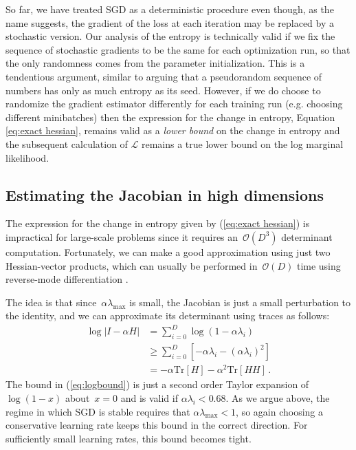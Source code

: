 \documentclass[]{article}
\newcommand{\varL}{\mathcal{L}}
\newcommand{\stepsize}{\alpha}
\newcommand{\bigo}[1]{\mathcal{O}\left(#1\right)}
\newcommand{\trace}[1]{\text{Tr}\left[#1\right]}
\begin{document}
So far, we have treated SGD as a deterministic procedure even though, as the name suggests,
the gradient of the loss at each iteration may be replaced by a stochastic
version. Our analysis of the entropy is technically valid if we fix the sequence of stochastic gradients to be the same for each optimization run, so that the only randomness comes from the parameter initialization.
This is a tendentious argument, similar to arguing that a pseudorandom sequence of numbers has only as much entropy as its seed.
However, if we do choose to randomize the gradient estimator differently for each training run
(e.g. choosing different minibatches) then the expression for the change in entropy, Equation \ref{eq:exact hessian}, remains valid as a \emph{lower bound} on the change in entropy and the 
subsequent calculation of $\varL$ remains a true lower bound on the log marginal likelihood.


\subsection{Estimating the Jacobian in high dimensions}
\label{sec:scalable-estimator}
The expression for the change in entropy given by (\ref{eq:exact hessian}) is impractical for large-scale problems since it requires an~$\bigo{D^3}$ determinant computation.
Fortunately, we can make a good approximation using just two Hessian-vector products, which can usually be performed in~$\bigo{D}$ time using reverse-mode differentiation \citep{pearlmutter1994fast}.

The idea is that since~$\stepsize\lambda_{\text{max}}$ is small, the Jacobian is just a small perturbation to the identity, and we can approximate its determinant using traces as follows:
%
\begin{align}
\log \left| I - \stepsize H \right|
& =    \sum_{i=0}^D \log\left(1 - \stepsize\lambda_i\right) \nonumber\\
& \geq \sum_{i=0}^D \left[- \stepsize\lambda_i 
                        - (\stepsize\lambda_i)^2 \right] \label{eq:logbound} \\
& = - \stepsize \trace{H} - \stepsize^2 \trace{HH}\,.
\end{align}
%
The bound in (\ref{eq:logbound}) is just a second order Taylor expansion of~$\log(1 - x)$ about~${x = 0}$ and is valid if ${\stepsize\lambda_i < 0.68}$.
As we argue above, the regime in which SGD is stable requires that $\stepsize\lambda_{\text{max}} < 1$, so again choosing a conservative learning rate keeps this bound in the correct direction.
For sufficiently small learning rates, this bound becomes tight.
\end{document}
